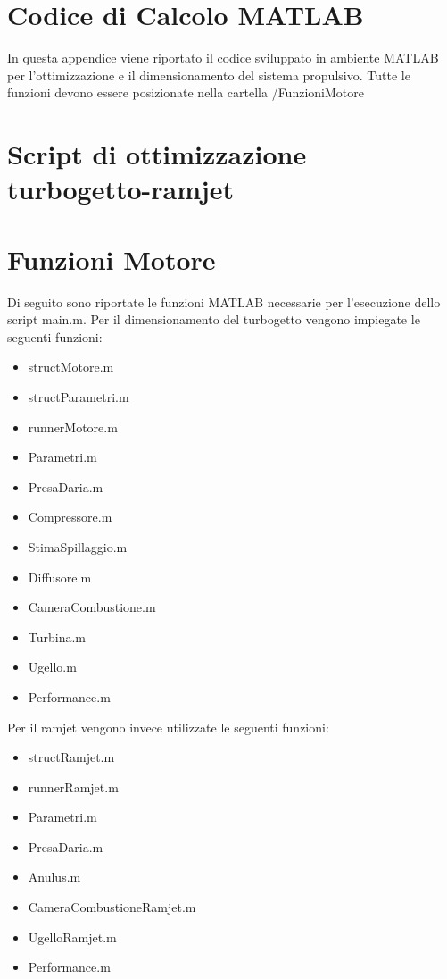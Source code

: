 \section{Codice di Calcolo MATLAB}
\label{app:codici}

In questa appendice viene riportato il codice sviluppato in ambiente MATLAB per l'ottimizzazione e il dimensionamento del sistema propulsivo. Tutte le funzioni devono essere posizionate nella cartella /FunzioniMotore

\section{Script di ottimizzazione turbogetto-ramjet}


\section{Funzioni Motore}
Di seguito sono riportate le funzioni MATLAB necessarie per l'esecuzione dello script main.m. Per il dimensionamento del turbogetto vengono impiegate le seguenti funzioni:

\begin{itemize}
    \item structMotore.m
    \item structParametri.m
    \item runnerMotore.m 
    \item Parametri.m
    \item PresaDaria.m 
    \item Compressore.m
    \item StimaSpillaggio.m
    \item Diffusore.m
    \item CameraCombustione.m 
    \item Turbina.m
    \item Ugello.m
    \item Performance.m
\end{itemize}
Per il ramjet vengono invece utilizzate le seguenti funzioni:
\begin{itemize}
    \item structRamjet.m
    \item runnerRamjet.m 
    \item Parametri.m
    \item PresaDaria.m 
    \item Anulus.m 
    \item CameraCombustioneRamjet.m
    \item UgelloRamjet.m
    \item Performance.m
\end{itemize}

